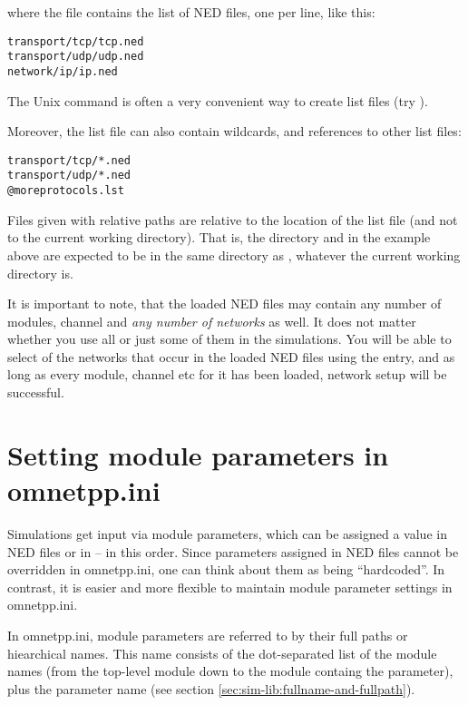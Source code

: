 where the  file contains the list of NED files,
one per line, like this:

\begin{verbatim}
transport/tcp/tcp.ned
transport/udp/udp.ned
network/ip/ip.ned
\end{verbatim}

The Unix  command is often a very convenient way
to create list files (try ).

Moreover, the list file can also contain wildcards, and references
to other list files:

\begin{verbatim}
transport/tcp/*.ned
transport/udp/*.ned
@moreprotocols.lst
\end{verbatim}

Files given with relative paths are relative to the location of the
list file (and not to the current working directory). That is,
the  directory and  in the example
above are expected to be in the same directory as ,
whatever the current working directory is.

It is important to note, that the loaded NED files may contain
any number of modules, channel and \textit{any number of networks} as well.
It does not matter whether you use all or just some of them
in the simulations. You will be able to select  of the
networks that occur in the loaded NED files using the 
 entry, and as long as every module, channel etc
for it has been loaded, network setup will be successful.


\section{Setting module parameters in omnetpp.ini}
\label{sec:ch-run-sim:parameter-settings}

Simulations get input via module parameters, which can be assigned a
value in NED files or in  -- in this order. Since parameters
assigned in NED files cannot be overridden in omnetpp.ini, one can
think about them as being ``hardcoded''. In contrast, it is easier
and more flexible to maintain module parameter settings in omnetpp.ini.

In omnetpp.ini, module parameters are referred to by their full paths
or hiearchical names. This name consists of the dot-separated list of
the module names (from the top-level module down to the module containg
the parameter), plus the parameter name
(see section \ref{sec:sim-lib:fullname-and-fullpath}).


